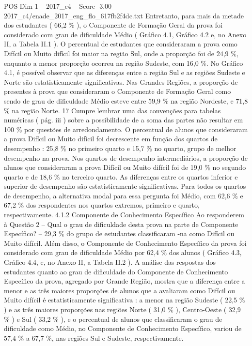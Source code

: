 \begin{textsample}{POS Dim 1 – 2017\_c4 – Score -3.00 – 2017\_c4/enade\_2017\_eng\_flo\_617fb2f4dc.txt}
Entretanto, para mais da metade dos estudantes ( 66,2 \% ), o Componente de Formação Geral da prova foi considerado com grau de dificuldade Médio ( Gráfico 4.1, Gráfico 4.2 e, no Anexo II, a Tabela II.1 ).
O percentual de estudantes que consideraram a prova como Difícil ou Muito difícil foi maior na região Sul, onde a proporção foi de 24,9 \%, enquanto a menor proporção ocorreu na região Sudeste, com 16,0 \%.
No Gráfico 4.1, é possível observar que as diferenças entre a região Sul e as regiões Sudeste e Norte são estatisticamente significativas.
Nas Grandes Regiões, a proporção de presentes à prova que consideraram o Componente de Formação Geral como sendo de grau de dificuldade Médio esteve entre 59,9 \% na região Nordeste, e 71,8 \% na região Norte. 17 Cumpre lembrar uma das convenções para tabelas numéricas ( pág. iii ) sobre a possibilidade de a soma das partes não resultar em 100 \% por questões de arredondamento.
O percentual de alunos que consideraram a prova Difícil ou Muito difícil foi decrescente em função dos quartos de desempenho : 25,8 \% no primeiro quarto e 15,7 \% no quarto, grupo de melhor desempenho na prova.
Nos quartos de desempenho intermediários, a proporção de alunos que consideraram a prova Difícil ou Muito difícil foi de 19,0 \% no segundo quarto e de 18,6 \% no terceiro quarto.
As diferenças entre os quartos inferior e superior de desempenho são estatisticamente significativas.
Para todos os quartos de desempenho, a alternativa modal para essa pergunta foi Médio, com 62,6 \% e 67,2 \% dos respondentes nos quartos extremos, primeiro e quarto, respectivamente. 4.1.2 Componente de Conhecimento Específico Ao responderem à Questão 2 – Qual o grau de dificuldade desta prova na parte de Componente Específico? – 29,3 \% do grupo de estudantes classificaram -na como Difícil ou Muito difícil.
Além disso, o Componente de Conhecimento Específico da prova foi considerado com grau de dificuldade Médio por 62,4 \% dos alunos ( Gráfico 4.3, Gráfico 4.4, e, no Anexo II, a Tabela II.2 ).
A análise das respostas dos estudantes quanto ao grau de dificuldade do Componente de Conhecimento Específico da prova, agregado por Grande Região, mostra que a diferença entre a menor e as três maiores proporções de alunos que a avaliaram como Difícil ou Muito difícil é estatisticamente significativa : a menor na região Sudeste ( 22,5 \% ) e as três maiores proporções nas regiões Norte ( 31,0 \% ), Centro-Oeste ( 32,9 \% ) e Sul ( 33,2 \% ), e o percentual de alunos que classificaram o grau de dificuldade como Médio, no Componente de Conhecimento Específico, variou de 57,4 \% a 67,7 \%, nas regiões Sul e Sudeste, respectivamente.

\end{textsample}
